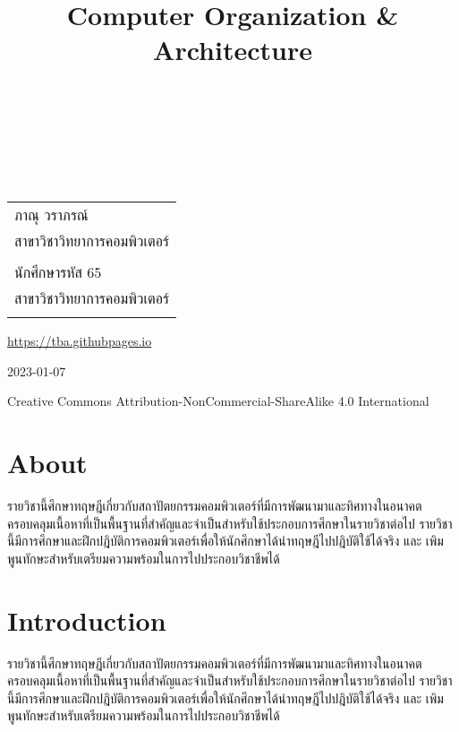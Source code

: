 \documentclass[
  notoc %
]{tufte-book}
\title{Computer Organization \& Architecture}
\author{\noindent{ภาณุ วราภรณ์}\\[3mm] \noindent{นักศึกษารหัส
65}\\[3mm] }
\date{}
\begin{document}
\makeatletter
\thispagestyle{empty}
\vfill
{\Huge\bf
\noindent
\@title
}\\[1in]
{\Large
\noindent
\@author
}
\makeatother

\makeatletter
\newpage
\thispagestyle{empty}
\vfill
{\noindent
\begin{tabular}{l} ภาณุ วราภรณ์\\ สาขาวิชาวิทยาการคอมพิวเตอร์\\ \\ นักศึกษารหัส 65\\ สาขาวิชาวิทยาการคอมพิวเตอร์\\ \\ \end{tabular}
}
\vfill
{\small
\url{https://tba.githubpages.io}

2023-01-07

Creative Commons Attribution-NonCommercial-ShareAlike 4.0 International
}
\makeatother


\frontmatter
\mainmatter
{}

\setcounter{tocdepth}{1}
\tableofcontents

\justifying

\setlength{\parindent}{0pt}

\hypertarget{about}{%
\chapter*{About}\label{about}}

รายวิชานี้ศึกษาทฤษฎีเกี่ยวกับสถาปัตยกรรมคอมพิวเตอร์ที่มีการพัฒนามาและทิศทางในอนาคต
ครอบคลุมเนื้อหาที่เป็นพื้นฐานที่สำคัญและจำเป็นสำหรับใช้ประกอบการศึกษาในรายวิชาต่อไป
รายวิชานี้มีการศึกษาและฝึกปฎิบัติการคอมพิวเตอร์เพื่อให้นักศึกษาได้นำทฤษฎีไปปฎิบัติใช้ได้จริง
และ เพิมพูนทักษะสำหรับเตรียมความพร้อมในการไปประกอบวิชาชีพได้

\hypertarget{sec:intro}{%
\chapter{Introduction}\label{sec:intro}}

รายวิชานี้ศึกษาทฤษฎีเกี่ยวกับสถาปัตยกรรมคอมพิวเตอร์ที่มีการพัฒนามาและทิศทางในอนาคต
ครอบคลุมเนื้อหาที่เป็นพื้นฐานที่สำคัญและจำเป็นสำหรับใช้ประกอบการศึกษาในรายวิชาต่อไป
รายวิชานี้มีการศึกษาและฝึกปฎิบัติการคอมพิวเตอร์เพื่อให้นักศึกษาได้นำทฤษฎีไปปฎิบัติใช้ได้จริง
และ เพิมพูนทักษะสำหรับเตรียมความพร้อมในการไปประกอบวิชาชีพได้
\end{document}
